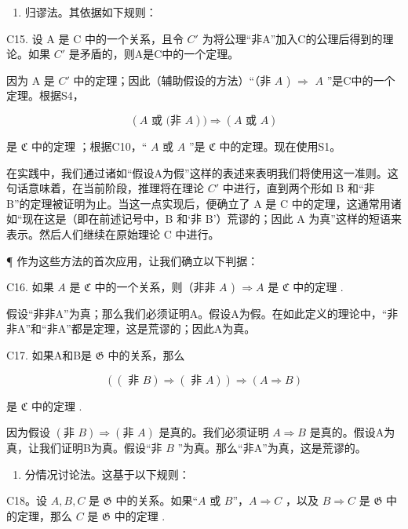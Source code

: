 \begin{enumerate}
\def\labelenumi{\Roman{enumi}.}
\setcounter{enumi}{1}
\tightlist
\item
  归谬法。其依据如下规则：
\end{enumerate}

C15. 设 A 是 C 中的一个关系，且令 \(C'\) 为将公理“非A”加入C的公理后得到的理论。如果 \(C'\) 是矛盾的，则A是C中的一个定理。

因为 A 是 \(C'\) 中的定理；因此（辅助假设的方法）“（非 \(A\) ) \(\Longrightarrow\) \(A\) ”是C中的一个定理。根据S4，

\[
(A \text {   或   (非   } A)) \Longrightarrow (A \text {   或   } A)
\]

是 \(\mathfrak{C}\) 中的定理 ；根据C10，“ \(A\) 或 \(A\) ”是 \(\mathfrak{C}\) 中的定理。现在使用S1。

在实践中，我们通过诸如“假设A为假”这样的表述来表明我们将使用这一准则。这句话意味着，在当前阶段，推理将在理论 \(C'\) 中进行，直到两个形如 B 和“非 B”的定理被证明为止。当这一点实现后，便确立了 A 是 C 中的定理，这通常用诸如“现在这是（即在前述记号中，B 和‘非 B’）荒谬的；因此 A 为真”这样的短语来表示。然后人们继续在原始理论 C 中进行。

¶ 作为这些方法的首次应用，让我们确立以下判据：

C16. 如果 \(A\) 是 \(\mathfrak{C}\) 中的一个关系，则（非非 \(A\) ) \(\Longrightarrow A\) 是 \(\mathfrak{C}\) 中的定理 .

假设“非非A”为真；那么我们必须证明A。假设A为假。在如此定义的理论中，“非非A”和“非A”都是定理，这是荒谬的；因此A为真。

C17. 如果A和B是 \(\mathfrak{G}\) 中的关系，那么

\[
((\text { 非 } B) \Longrightarrow (\text { 非 } A)) \Longrightarrow (A \Longrightarrow B)
\]

是 \(\mathfrak{C}\) 中的定理 .

因为假设 \((\text{非 } B) \Longrightarrow (\text{非 } A)\) 是真的。我们必须证明 \(A \Longrightarrow B\) 是真的。假设A为真，让我们证明B为真。假设“非 \(B\) ”为真。那么“非A”为真，这是荒谬的。

\begin{enumerate}
\def\labelenumi{\Roman{enumi}.}
\setcounter{enumi}{2}
\tightlist
\item
  分情况讨论法。这基于以下规则：
\end{enumerate}

C18。设 \(A, B, C\) 是 \(\mathfrak{G}\) 中的关系。如果“\(A\) 或 \(B\)”，\(A \Longrightarrow C\) ，以及 \(B \Longrightarrow C\) 是 \(\mathfrak{G}\) 中的定理，那么 \(C\) 是 \(\mathfrak{G}\) 中的定理 .

